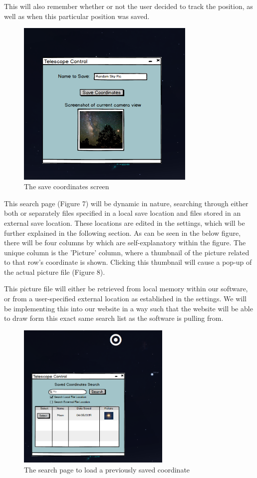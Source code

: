 \documentclass[12pt]{report}
\begin{document}
This will also remember whether or not the user decided to track the position, as well as when this particular position was saved.


\begin{figure}[h]
	\centering
	\includegraphics[width=0.60\linewidth, height=8cm]{Save}
	\caption{The save coordinates screen}
\end{figure}

This search page (Figure 7) will be dynamic in nature, searching through either both or separately files specified in a local save location and files stored in an external save location. These locations are edited in the settings, which will be further explained in the following section. As can be seen in the below figure, there will be four columns by which are self-explanatory within the figure. The unique column is the 'Picture' column, where a thumbnail of the picture related to that row's coordinate is shown. Clicking this thumbnail will cause a pop-up of the actual picture file (Figure 8).

This picture file will either be retrieved from local memory within our software, or from a user-specified external location as established in the settings. We will be implementing this into our website in a way such that the website will be able to draw form this exact same search list as the software is pulling from.

\begin{figure}[h]
	\centering
	\includegraphics[width=0.55\linewidth, height=7.0cm]{SearchPage}
	\caption{The search page to load a previously saved coordinate}
\end{figure}
\end{document}
